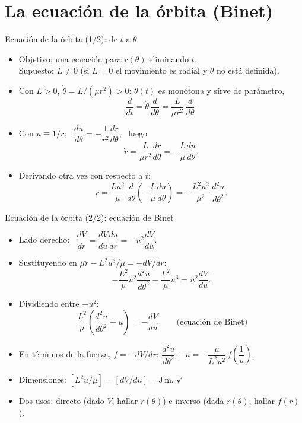 \documentclass[spanish]{beamer}
\begin{document}
\section{La ecuación de la órbita (Binet)}
\begin{frame}{Ecuación de la órbita (1/2): de $t$ a $\theta$}
\begin{itemize}
\item<1-> Objetivo: una ecuación para $r(\theta)$ eliminando $t$. \\
Supuesto: $L\neq0$ (si $L=0$ el movimiento es radial y $\theta$ no está definida).
\item<2-> Con $L>0$, $\dot\theta=L/(\mu r^2)>0$: $\theta(t)$ es monótona y sirve de parámetro,
\[\frac{d}{dt}=\dot\theta\,\frac{d}{d\theta}=\frac{L}{\mu r^2}\,\frac{d}{d\theta}.\]
\item<3-> Con $u\equiv1/r$: \ $\dfrac{du}{d\theta}=-\dfrac{1}{r^2}\dfrac{dr}{d\theta}$, \ luego
\[\dot r=\frac{L}{\mu r^2}\frac{dr}{d\theta}=-\frac{L}{\mu}\frac{du}{d\theta}.\]
\item<4-> Derivando otra vez con respecto a $t$:
\[\ddot r=\frac{L u^2}{\mu}\,\frac{d}{d\theta}\!\left(-\frac{L}{\mu}\frac{du}{d\theta}\right)
=-\frac{L^2u^2}{\mu^2}\,\frac{d^2u}{d\theta^2}.\]
\end{itemize}
\end{frame}

\begin{frame}{Ecuación de la órbita (2/2): ecuación de Binet}
\begin{itemize}
\item<1-> Lado derecho: \ $\dfrac{dV}{dr}=\dfrac{dV}{du}\dfrac{du}{dr}=-u^2\dfrac{dV}{du}$.
\item<2-> Sustituyendo en $\mu\ddot r-L^2u^3/\mu=-dV/dr$:
\[-\frac{L^2}{\mu}u^2\frac{d^2u}{d\theta^2}-\frac{L^2}{\mu}u^3=u^2\frac{dV}{du}.\]
\item<3-> Dividiendo entre $-u^2$:
\[\boxed{\ \frac{L^2}{\mu}\left(\frac{d^2u}{d\theta^2}+u\right)=-\frac{dV}{du}\ }\qquad\text{(ecuación de Binet)}\]
\item<4-> En términos de la fuerza, $f=-dV/dr$: \quad
$\dfrac{d^2u}{d\theta^2}+u=-\dfrac{\mu}{L^2u^2}\,f\!\left(\dfrac1u\right)$.
\item<5-> Dimensiones: $[L^2u/\mu]=[dV/du]=\mathrm{J\,m}$. $\checkmark$
\item<6-> Dos usos: \alert{directo} (dado $V$, hallar $r(\theta)$) e \alert{inverso} (dada $r(\theta)$, hallar $f(r)$).
\end{itemize}
\end{frame}
\end{document}
